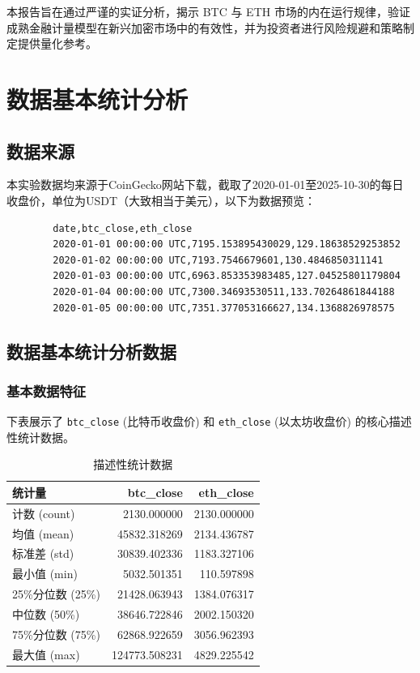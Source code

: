 \documentclass[a4paper]{ctexart}
\begin{document}
	本报告旨在通过严谨的实证分析，揭示 BTC 与 ETH 市场的内在运行规律，验证成熟金融计量模型在新兴加密市场中的有效性，并为投资者进行风险规避和策略制定提供量化参考。
	
	\section{数据基本统计分析}
	\subsection{数据来源}
	本实验数据均来源于CoinGecko网站下载，截取了2020-01-01至2025-10-30的每日收盘价，单位为USDT（大致相当于美元），以下为数据预览：
	
	\begin{verbatim}
		date,btc_close,eth_close
		2020-01-01 00:00:00 UTC,7195.153895430029,129.18638529253852
		2020-01-02 00:00:00 UTC,7193.7546679601,130.4846850311141
		2020-01-03 00:00:00 UTC,6963.853353983485,127.04525801179804
		2020-01-04 00:00:00 UTC,7300.34693530511,133.70264861844188
		2020-01-05 00:00:00 UTC,7351.377053166627,134.1368826978575
	\end{verbatim}
	
	\subsection{数据基本统计分析数据}
	\subsubsection{基本数据特征}
	下表展示了 \texttt{btc\_close} (比特币收盘价) 和 \texttt{eth\_close} (以太坊收盘价) 的核心描述性统计数据。
	
	\begin{table}[htbp]
		\centering
		\caption{描述性统计数据}
		\label{tab:desc_stats}
		\begin{tabular}{lrr}
			\toprule
			统计量 & btc\_close & eth\_close \\
			\midrule
			计数 (count) & 2130.000000 & 2130.000000 \\
			均值 (mean) & 45832.318269 & 2134.436787 \\
			标准差 (std) & 30839.402336 & 1183.327106 \\
			最小值 (min) & 5032.501351 & 110.597898 \\
			25\%分位数 (25\%) & 21428.063943 & 1384.076317 \\
			中位数 (50\%) & 38646.722846 & 2002.150320 \\
			75\%分位数 (75\%) & 62868.922659 & 3056.962393 \\
			最大值 (max) & 124773.508231 & 4829.225542 \\
			\bottomrule
		\end{tabular}
	\end{table}
	
\end{document}
